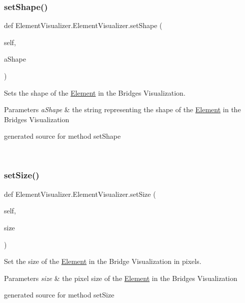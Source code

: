 \subsubsection{\texorpdfstring{set\+Shape()}{setShape()}}
{\footnotesize\ttfamily def Element\+Visualizer.\+Element\+Visualizer.\+set\+Shape (\begin{DoxyParamCaption}\item[{}]{self,  }\item[{}]{a\+Shape }\end{DoxyParamCaption})}



Sets the shape of the \hyperlink{namespace_element}{Element} in the Bridges Visualization. 


\begin{DoxyParams}{Parameters}
{\em a\+Shape} & the string representing the shape of the \hyperlink{namespace_element}{Element} in the Bridges Visualization\begin{DoxyVerb}generated source for method setShape \end{DoxyVerb}
 \\
\hline
\end{DoxyParams}
\hypertarget{class_element_visualizer_1_1_element_visualizer_a62cc4d3f47385ae6d60b34b651456f29}{}\label{class_element_visualizer_1_1_element_visualizer_a62cc4d3f47385ae6d60b34b651456f29} 
\subsubsection{\texorpdfstring{set\+Size()}{setSize()}}
{\footnotesize\ttfamily def Element\+Visualizer.\+Element\+Visualizer.\+set\+Size (\begin{DoxyParamCaption}\item[{}]{self,  }\item[{}]{size }\end{DoxyParamCaption})}



Set the size of the \hyperlink{namespace_element}{Element} in the Bridge Visualization in pixels. 


\begin{DoxyParams}{Parameters}
{\em size} & the pixel size of the \hyperlink{namespace_element}{Element} in the Bridges Visualization\begin{DoxyVerb}generated source for method setSize \end{DoxyVerb}
 \\
\hline
\end{DoxyParams}


